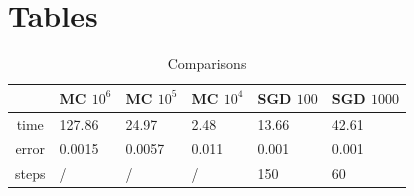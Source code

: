 \documentclass[a4paper,11pt,openright]{report}
\begin{document}
\newpage
\section{Tables}
\begin{table}[H]
\centering
\addtolength{\leftskip}{-1.5cm}
\addtolength{\rightskip}{-1.5cm}
\begin{tabular}{|c|lllll|}
\hline
$ $ & MC $10^6$ & MC $10^5$ & MC $10^4$ & SGD $100$ & SGD $1000$\\
\hline
time & 127.86 & 24.97 & 2.48 & 13.66 & 42.61 \\

error & 0.0015 & 0.0057 & 0.011 & 0.001 & 0.001 \\

steps & / & / & / & 150 & 60 \\

\hline
\end{tabular}
\caption{Comparisons}
\end{table}
\end{document}
